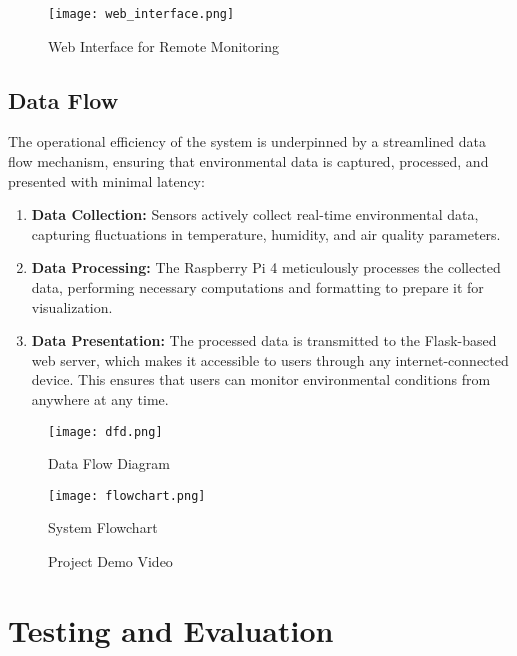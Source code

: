 \documentclass[a4paper, 12pt]{report}
\begin{document}
\begin{figure}[H]
    \centering
    \texttt{[image: web\_interface.png]}
    \caption{Web Interface for Remote Monitoring}
    \label{fig:web_interface}
\end{figure}

\subsection{Data Flow}
The operational efficiency of the system is underpinned by a streamlined data flow mechanism, ensuring that environmental data is captured, processed, and presented with minimal latency:
\begin{enumerate}
    \item \textbf{Data Collection:} Sensors actively collect real-time environmental data, capturing fluctuations in temperature, humidity, and air quality parameters.
    \item \textbf{Data Processing:} The Raspberry Pi 4 meticulously processes the collected data, performing necessary computations and formatting to prepare it for visualization.
    \item \textbf{Data Presentation:} The processed data is transmitted to the Flask-based web server, which makes it accessible to users through any internet-connected device. This ensures that users can monitor environmental conditions from anywhere at any time.
\end{enumerate}

\begin{figure}[H]
    \centering
    \texttt{[image: dfd.png]}
    \caption{Data Flow Diagram}
    \label{fig:dfd}
\end{figure}

\begin{figure}[H]
    \centering
    \texttt{[image: flowchart.png]}
    \caption{System Flowchart}
    \label{fig:flowchart}
\end{figure}

\begin{figure}[H]
    \centering
    \caption{Project Demo Video}
    \label{fig:demo_video}
\end{figure}

\section{Testing and Evaluation}
\end{document}
